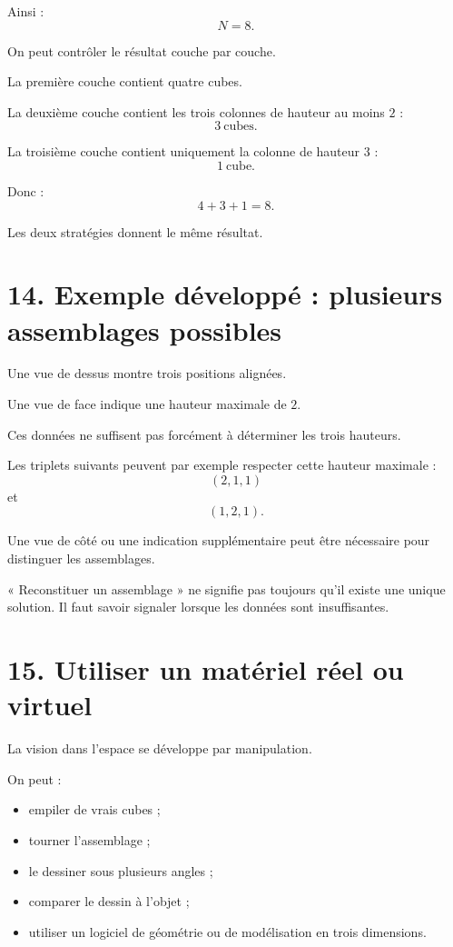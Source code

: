 Ainsi :
\[
\boxed{N=8}.
\]

On peut contrôler le résultat couche par couche.

La première couche contient quatre cubes.

La deuxième couche contient les trois colonnes de hauteur au moins $2$ :
\[
3\ \text{cubes}.
\]

La troisième couche contient uniquement la colonne de hauteur $3$ :
\[
1\ \text{cube}.
\]

Donc :
\[
4+3+1=8.
\]

Les deux stratégies donnent le même résultat.

\section{14. Exemple développé : plusieurs assemblages possibles}

Une vue de dessus montre trois positions alignées.

Une vue de face indique une hauteur maximale de $2$.

Ces données ne suffisent pas forcément à déterminer les trois hauteurs.

Les triplets suivants peuvent par exemple respecter cette hauteur maximale :
\[
(2,1,1)
\]
et
\[
(1,2,1).
\]

Une vue de côté ou une indication supplémentaire peut être nécessaire pour distinguer les assemblages.

\begin{attention}
« Reconstituer un assemblage » ne signifie pas toujours qu'il existe une unique solution. Il faut savoir signaler lorsque les données sont insuffisantes.
\end{attention}

\section{15. Utiliser un matériel réel ou virtuel}

La vision dans l'espace se développe par manipulation.

On peut :
\begin{itemize}
\item empiler de vrais cubes ;
\item tourner l'assemblage ;
\item le dessiner sous plusieurs angles ;
\item comparer le dessin à l'objet ;
\item utiliser un logiciel de géométrie ou de modélisation en trois dimensions.
\end{itemize}

